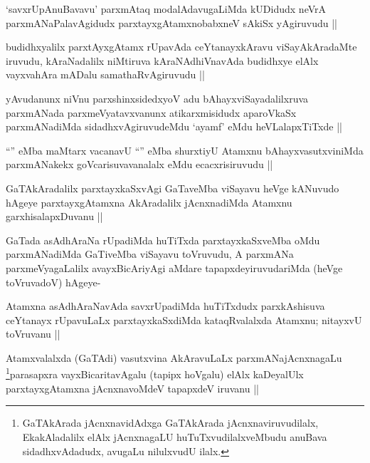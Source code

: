 \begin{artha}
`savxrUpAnuBavavu' parxmAtaq modalAdavugaLiMda kUDidudx neVrA parxmANaPalavAgidudx parxtayxgAtamxnobabxneV sAkiSx yAgiruvudu ||
\end{artha}

\begin{artha}
budidhxyalilx parxtAyxgAtamx rUpavAda ceYtanayxkAravu viSayAkAradaMte iruvudu, kAraNadalilx niMtiruva kAraNAdhiVnavAda budidhxye elAlx vayxvahAra mADalu samathaRvAgiruvudu ||
\end{artha}

\begin{artha}
yAvudanunx niVnu parxshinxsidedxyoV adu bAhayxviSayadalilxruva parxmANada parxmeVyatavxvanunx atikarxmisidudx aparoVkaSx parxmANadiMda sidadhxvAgiruvudeMdu `ayamf' eMdu heVLalapxTiTxde ||
\end{artha}

\begin{artha}
``\stext'' eMba maMtarx vacanavU ``\stext'' eMba shurxtiyU Atamxnu bAhayxvasutxviniMda parxmANakekx goVcarisuvavanalalx eMdu ecacxrisiruvudu ||
\end{artha}

\begin{artha}
GaTAkAradalilx parxtayxkaSxvAgi GaTaveMba viSayavu heVge kANuvudo hAgeye parxtayxgAtamxna AkAradalilx jAcnxnadiMda Atamxnu garxhisalapxDuvanu ||
\end{artha}

\begin{artha}
GaTada asAdhAraNa rUpadiMda huTiTxda parxtayxkaSxveMba oMdu parxmANadiMda GaTiveMba viSayavu toVruvudu, A parxmANa parxmeVyagaLalilx avayxBicAriyAgi aMdare tapapxdeyiruvudariMda (heVge toVruvadoV) hAgeye-
\end{artha}

\begin{artha}
Atamxna asAdhAraNavAda savxrUpadiMda huTiTxdudx parxkAshisuva ceYtanayx rUpavuLaLx parxtayxkaSxdiMda kataqRvalalxda Atamxnu; nitayxvU toVruvanu ||
\end{artha}

\begin{artha}
Atamxvalalxda (GaTAdi) vasutxvina AkAravuLaLx parxmANajAcnxnagaLu \footnote{GaTAkArada jAcnxnavidAdxga GaTAkArada jAcnxnaviruvudilalx, EkakAladalilx elAlx jAcnxnagaLU huTuTxvudilalxveMbudu anuBava sidadhxvAdadudx, avugaLu nilulxvudU ilalx.}parasapxra vayxBicaritavAgalu (tapipx hoVgalu) elAlx kaDeyalUlx parxtayxgAtamxna jAcnxnavoMdeV tapapxdeV iruvanu ||
\end{artha}

